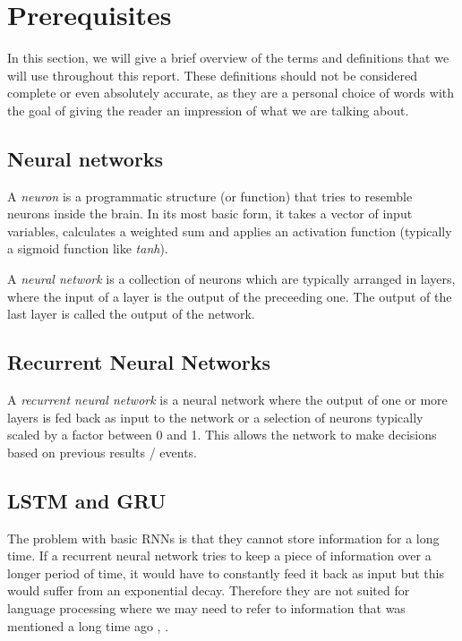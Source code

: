 \section{Prerequisites}
\label{sec:prerequisites}

  In this section, we will give a brief overview of the terms and definitions
  that we will use throughout this report. These definitions should not be
  considered complete or even absolutely accurate, as they are a personal
  choice of words with the goal of giving the reader an impression of what
  we are talking about.

  \subsection{Neural networks}
  \label{sub:neural_networks}
  
    A \textit{neuron} is a programmatic structure (or function) that tries to resemble
    neurons inside the brain. In its most basic form, it takes a vector of
    input variables, calculates a weighted sum and applies an activation function
    (typically a sigmoid function like \textit{tanh}).

    A \textit{neural network} is a collection of neurons which are typically
    arranged in layers, where the input of a layer is the output of the
    preceeding one. The output of the last layer is called the output of
    the network.

  \subsection{Recurrent Neural Networks}
  \label{sub:recurrent_neural_networks}
  
    A \textit{recurrent neural network} is a neural network where the
    output of one or more layers is fed back as input to the network
    or a selection of neurons typically scaled by a factor between 0
    and 1. This allows the network to make decisions based on previous
    results / events.

  \subsection{LSTM and GRU}
  \label{sub:lstm_and_gru}
  
    The problem with basic RNNs is that they cannot store information for a long time.
    If a recurrent neural network tries to keep a piece of information over a longer
    period of time, it would have to constantly feed it back as input but this would
    suffer from an exponential decay. Therefore they are not suited for language processing
    where we may need to refer to information that was mentioned a long time ago \cite{hrdipl}, \cite{bengio}.

